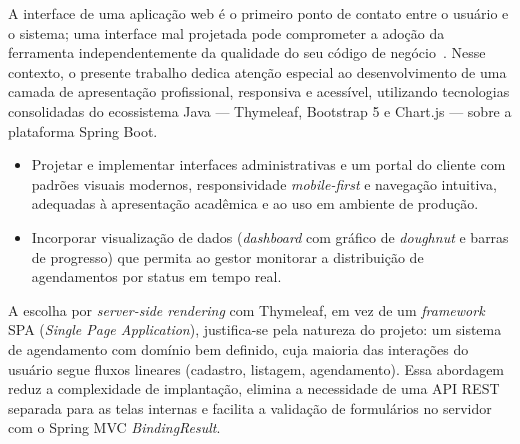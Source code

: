 %



A interface de uma aplicação web é o primeiro ponto de contato entre
o usuário e o sistema; uma interface mal projetada pode comprometer a
adoção da ferramenta independentemente da qualidade do seu código de
negócio~\cite{nielsen1994}.  Nesse contexto, o presente trabalho dedica
atenção especial ao desenvolvimento de uma camada de apresentação
profissional, responsiva e acessível, utilizando tecnologias consolidadas
do ecossistema Java — Thymeleaf, Bootstrap 5 e Chart.js — sobre a
plataforma Spring Boot.

\begin{itemize}
  \item Projetar e implementar interfaces administrativas e um portal do
    cliente com padrões visuais modernos, responsividade \textit{mobile-first}
    e navegação intuitiva, adequadas à apresentação acadêmica e ao uso
    em ambiente de produção.
  \item Incorporar visualização de dados (\textit{dashboard} com gráfico de
    \textit{doughnut} e barras de progresso) que permita ao gestor monitorar
    a distribuição de agendamentos por status em tempo real.
\end{itemize}

A escolha por \textit{server-side rendering} com Thymeleaf, em vez de um
\textit{framework} SPA (\textit{Single Page Application}), justifica-se pela
natureza do projeto: um sistema de agendamento com domínio bem definido,
cuja maioria das interações do usuário segue fluxos lineares (cadastro,
listagem, agendamento). Essa abordagem reduz a complexidade de implantação,
elimina a necessidade de uma API REST separada para as telas internas e
facilita a validação de formulários no servidor com o Spring MVC
\textit{BindingResult}.


